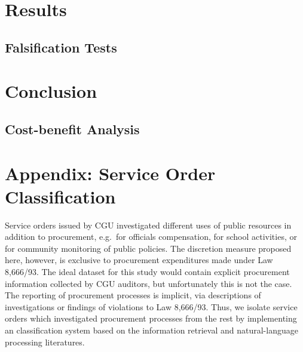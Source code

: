 \documentclass[11pt]{article}
\begin{document}
\section{Results} \label{sec:result}

\subsection{Falsification Tests} \label{subsec:discussion}

\section{Conclusion} \label{sec:conclusion}

\subsection{Cost-benefit Analysis} \label{subsec:cba}


\setlength\bibsep{0pt}



\clearpage







\clearpage

\appendix
\section{Appendix: Service Order Classification} \label{sec:appendixA}

Service orders issued by CGU investigated different uses of public resources in addition to procurement, e.g.~for officials compensation, for school activities, or for community monitoring of public policies. The discretion measure proposed here, however, is exclusive to procurement expenditures made under Law 8,666/93. The ideal dataset for this study would contain explicit procurement information collected by CGU auditors, but unfortunately this is not the case. The reporting of procurement processes is implicit, via descriptions of investigations or findings of violations to Law 8,666/93. Thus, we isolate service orders which investigated procurement processes from the rest by implementing an classification system based on the information retrieval and natural-language processing literatures.
\end{document}
